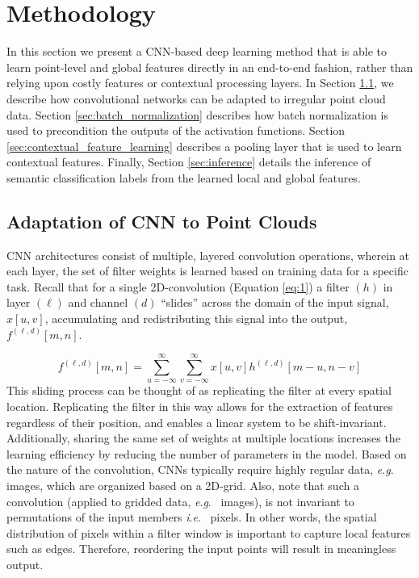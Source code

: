 \documentclass[final,3p,times,twocolumn,authoryear]{elsarticle}
\newcommand{\ie}{\textit{i}.\textit{e}.}
\newcommand{\eg}{\textit{e}.\textit{g}.}
\begin{document}
\section{Methodology}
\label{Methodology}
In this section we present a CNN-based deep learning method that is able to learn point-level and global features directly in an end-to-end fashion, rather than relying upon costly features or contextual processing layers. 
In Section \ref{sec:adaptation_of_cnn_to_point_clouds}, we describe how convolutional networks can be adapted to irregular point cloud data.
Section \ref{sec:batch_normalization} describes how batch normalization is used to precondition the outputs of the activation functions. 
Section \ref{sec:contextual_feature_learning} describes a pooling layer that is used to learn contextual features.
Finally, Section \ref{sec:inference} details the inference of semantic classification labels from the learned local and global features.
\subsection{Adaptation of CNN to Point Clouds}
\label{sec:adaptation_of_cnn_to_point_clouds}
CNN architectures consist of multiple, layered convolution operations, wherein at each layer, the set of filter weights is learned based on training data for a specific task. 
Recall that for a single 2D-convolution (Equation \ref{eq:1})  a filter $(h)$ in layer $(\ell)$ and channel $(d)$ ``slides'' across the domain of the input signal, $x[u,v]$, accumulating and redistributing this signal into the output, $f^{(\ell,d)}[m,n]$.
 
\begin{equation}
\label{eq:1}
f^{(\ell,d)}[m,n] = \sum_{u=-\infty}^{\infty} \sum_{v=-\infty}^{\infty} x[u,v] h^{(\ell,d)}[m-u,n-v]
\end{equation}
This sliding process can be thought of as replicating the filter at every spatial location.
Replicating the filter in this way allows for the extraction of features regardless of their position, and enables a linear system to be shift-invariant. 
Additionally, sharing the same set of weights at multiple locations increases the learning efficiency by reducing the number of parameters in the model. 
Based on the nature of the convolution, CNNs typically require highly regular data, \eg~ images, which are organized based on a 2D-grid. 
Also, note that such a convolution (applied to gridded data, \eg~ images), is not invariant to permutations of the input members \ie~ pixels. 
In other words, the spatial distribution of pixels within a filter window is important to capture local features such as edges. Therefore, reordering the input points will result in meaningless output. 
\end{document}
